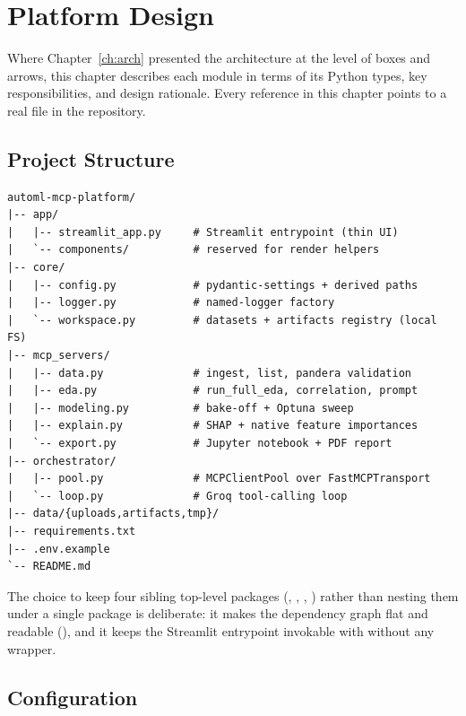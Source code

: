 \chapter{Platform Design}
\label{ch:design}

Where Chapter~\ref{ch:arch} presented the architecture at the level
of boxes and arrows, this chapter describes each module in terms of
its Python types, key responsibilities, and design rationale. Every
reference in this chapter points to a real file in the repository.

\section{Project Structure}
\label{sec:project-structure}

\begin{lstlisting}[style=alBash, caption={Top-level project structure.},
                    label={lst:tree}]
automl-mcp-platform/
|-- app/
|   |-- streamlit_app.py     # Streamlit entrypoint (thin UI)
|   `-- components/          # reserved for render helpers
|-- core/
|   |-- config.py            # pydantic-settings + derived paths
|   |-- logger.py            # named-logger factory
|   `-- workspace.py         # datasets + artifacts registry (local FS)
|-- mcp_servers/
|   |-- data.py              # ingest, list, pandera validation
|   |-- eda.py               # run_full_eda, correlation, prompt
|   |-- modeling.py          # bake-off + Optuna sweep
|   |-- explain.py           # SHAP + native feature importances
|   `-- export.py            # Jupyter notebook + PDF report
|-- orchestrator/
|   |-- pool.py              # MCPClientPool over FastMCPTransport
|   `-- loop.py              # Groq tool-calling loop
|-- data/{uploads,artifacts,tmp}/
|-- requirements.txt
|-- .env.example
`-- README.md
\end{lstlisting}

The choice to keep four sibling top-level packages
(, , , )
rather than nesting them under a single  package is
deliberate: it makes the dependency graph flat and readable
(),
and it keeps the Streamlit entrypoint invokable with
 without any wrapper.

\section{Configuration}
\label{sec:config}

